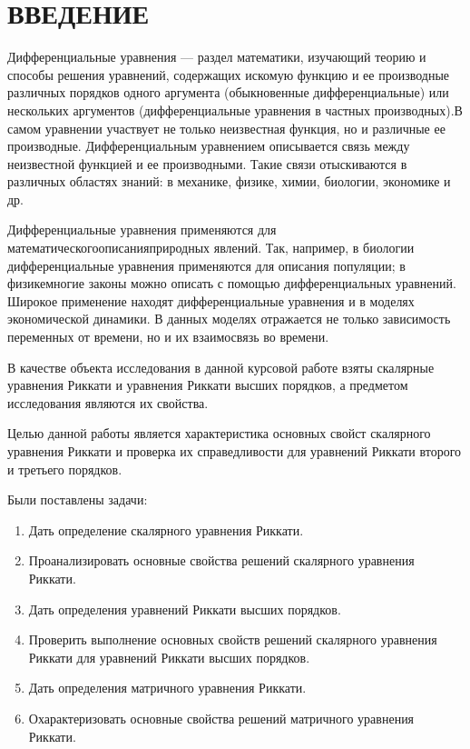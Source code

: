 \chapter*{\large ВВЕДЕНИЕ}  
Дифференциальные  уравнения --- раздел  математики, изучающий теорию и способы решения уравнений, содержащих искомую функцию и ее производные различных порядков одного аргумента (обыкновенные дифференциальные) или нескольких аргументов (дифференциальные уравнения в частных производных).В самом уравнении участвует не только неизвестная функция, но и различные ее производные. Дифференциальным уравнением описывается связь между неизвестной функцией и ее производными. Такие связи отыскиваются в различных областях знаний: в механике, физике, химии, биологии, экономике и др.

Дифференциальные уравнения применяются для математическогоописанияприродных явлений. Так, например, в биологии дифференциальные уравнения применяются для описания популяции; в физикемногие законы можно описать с помощью дифференциальных уравнений. Широкое применение находят дифференциальные  уравнения и в моделях экономической динамики. В данных моделях отражается не только зависимость переменных от времени, но и их взаимосвязь во времени.

В качестве объекта исследования в данной курсовой работе взяты скалярные уравнения Риккати и уравнения Риккати высших порядков, а предметом исследования являются их свойства.

Целью данной работы является характеристика основных свойст скалярного уравнения Риккати и проверка их справедливости для уравнений Риккати второго и третьего порядков.

Были поставлены задачи:
\begin{enumerate} 
  \item Дать определение скалярного уравнения Риккати.
  \item Проанализировать основные свойства решений скалярного уравнения Риккати.
  \item Дать определения уравнений Риккати высших порядков.
  \item Проверить выполнение основных свойств решений скалярного уравнения Риккати для уравнений Риккати высших порядков.
  \item Дать определения матричного уравнения Риккати.
  \item Охарактеризовать основные свойства решений матричного уравнения Риккати.
\end{enumerate}